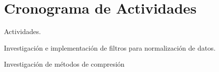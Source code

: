 \section{Cronograma de Actividades}


Actividades.

Investigación e implementación de filtros para normalización de datos.


Investigación de métodos de compresión


